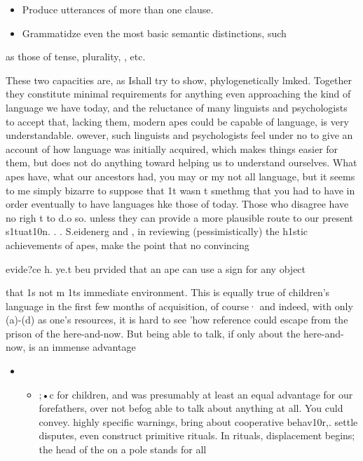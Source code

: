 
\begin{itemize}
\item Produce utterances of more than one clause.
\item Grammatidze even the most basic semantic distinctions, such
\end{itemize}

as those of tense, plurality, , etc.

These two capacities are, as Ishall try to show, phylogenetically lmked. Together they constitute minimal requirements for anything even approaching the kind of language we have today, and the reluc\-tance of many linguists and psychologists to accept that, lacking them, modern apes could be capable of language, is very understandable. owever, such linguists and psychologists feel under no  to give an account of how language was initially acquired, which makes things easier for them, but does not do anything toward helping us to understand ourselves. What apes have, what our ancestors had, you may or my not all language, but it seems to me simply bizarre to suppose
that 1t wasn t smethmg that you had to have in order eventually to
have languages hke those of today. Those who disagree have no righ t to
d.o so. unless they can provide a more plausible route to our present s1tuat10n.
. . S.eidenerg and \citet{Petitto1979}, in reviewing (pessimistically) the h1stic achievements of apes, make the point that no convincing

evide?ce h{\textquotedbl}{\textquotedbl}. ye.t beu prvided that an ape can use a sign for any object

that 1s not m 1ts immediate environment. This is equally true of chil\-dren's language in the first few months of acquisition, of course· and indeed, with only (a)-(d) as one's resources, it is hard to see 'how reference could escape from the prison of the here-and-now. But being able to talk, if only about the here-and-now, is an immense advantage

\begin{itemize}
\item \begin{itemize}
\item ;•c for children, and was presumably at least an equal advantage for our forefathers, over not befog able to talk about anything at all. You culd convey. highly specific warnings, bring about cooperative beha\-v10r,. settle disputes, even construct primitive rituals. In rituals, dis\-placement begins; the head of the  on a pole stands for all
\end{itemize}
\end{itemize}

